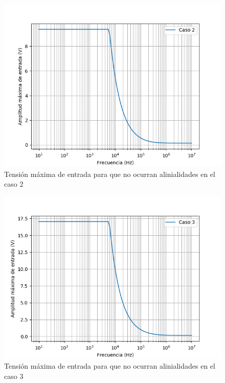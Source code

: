 \begin{figure}[H]
\begin{centering}
\includegraphics[scale=0.5]{../Ex1/iB/Resources1b/AmplMaxVsFreq2}
\par\end{centering}
\caption{Tensión máxima de entrada para que no ocurran alinialidades en el
caso 2}
\label{1_b_28}
\end{figure}

\begin{figure}[H]
\begin{centering}
\includegraphics[scale=0.5]{../Ex1/iB/Resources1b/AmplMaxVsFreq3}
\par\end{centering}
\caption{Tensión máxima de entrada para que no ocurran alinialidades en el
caso 3}
\label{1_b_29}
\end{figure}


